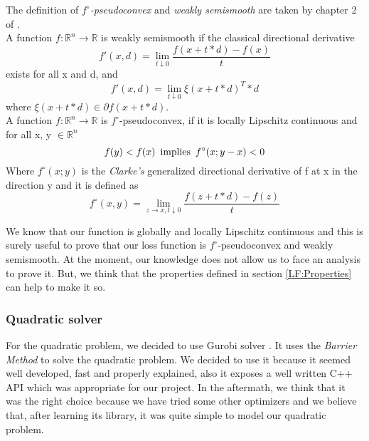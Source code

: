 The definition of \textit{$f^{\circ}$-pseudoconvex} and \textit{weakly semismooth} are taken by chapter 2 of \cite{PBM}.\\
A function $f : \mathbb{R}^n \rightarrow \mathbb{R}$ is weakly semismooth if the classical directional derivative
\begin{equation}
f'(x,d)=\lim_{t\downarrow 0}\frac{f(x+t*d)-f(x)}{t}
\end{equation}
exists for all x and d, and
\begin{equation}
f'(x,d)=\lim_{t\downarrow 0}\xi(x+t*d)^{T}*d
\end{equation}
where $\xi(x + t*d) \in \partial f (x + t*d)$. 
\\
A function $f : \mathbb{R}^n \rightarrow \mathbb{R}$ is $f^{\circ}$-pseudoconvex, if it is locally Lipschitz continuous and for all x, y $\in \mathbb{R}^n$
\begin{equation}
f(y)<f(x) \, \textnormal{ implies } \, f^{\circ}(x;y-x)<0
\end{equation}
Where $f^{\circ}(x;y)$ is the \textit{Clarke’s} generalized directional derivative of f at x in the direction y and it is defined as
\begin{equation}
f^{\circ}(x,y)=\lim_{z\rightarrow x,t\downarrow 0}\frac{f(z+t*d)-f(z)}{t}
\end{equation}

We know that our function is globally and locally Lipschitz continuous and this is surely useful to prove that our loss function is $f^{\circ}$-pseudoconvex and weakly semismooth.
At the moment, our knowledge does not allow us to face an analysis to prove it. But, we think that the properties defined in section \ref{LF:Properties} can help to make it so. 

\subsubsection{Quadratic solver}
For the quadratic problem, we decided to use Gurobi solver \cite{Gurobi}. It uses the \textit{Barrier Method} to solve the quadratic problem. We decided to use it because it seemed well developed, fast and properly explained, also it exposes a well written C++ API which was appropriate for our project. In the aftermath, we think that it was the right choice because we have tried some other optimizers and we believe that, after learning its library, it was quite simple to model our quadratic problem.
